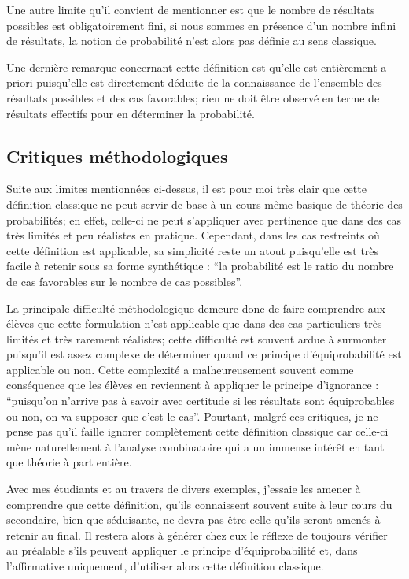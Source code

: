 \documentclass[11pt,a4paper]{article}
\begin{document}
Une autre limite qu'il convient de mentionner est que le nombre de résultats possibles est obligatoirement fini, si nous sommes en présence d'un nombre infini de résultats, la notion de probabilité n'est alors pas définie au sens classique.

Une dernière remarque concernant cette définition est qu'elle est entièrement a priori puisqu'elle est directement déduite de la connaissance de l'ensemble des résultats possibles et des cas favorables; rien ne doit être observé en terme de résultats effectifs pour en déterminer la probabilité.

\subsection{Critiques méthodologiques}

Suite aux limites mentionnées ci-dessus, il est pour moi très clair que cette définition classique ne peut servir de base à un cours même basique de théorie des probabilités; en effet, celle-ci ne peut s'appliquer avec pertinence que dans des cas très limités et peu réalistes en pratique. Cependant, dans les cas restreints où cette définition est applicable, sa simplicité reste un atout puisqu'elle est très facile à retenir sous sa forme synthétique : ``la probabilité est le ratio du nombre de cas favorables sur le nombre de cas possibles''.

La principale difficulté méthodologique demeure donc de faire comprendre aux élèves que cette formulation n'est applicable que dans des cas particuliers très limités et très rarement réalistes; cette difficulté est souvent ardue à surmonter puisqu'il est assez complexe de déterminer quand ce principe d'équiprobabilité est applicable ou non. Cette complexité a malheureusement souvent comme conséquence que les élèves en reviennent à appliquer le principe d'ignorance : ``puisqu'on n'arrive pas à savoir avec certitude si les résultats sont équiprobables ou non, on va supposer que c'est le cas''. Pourtant, malgré ces critiques, je ne pense pas qu'il faille ignorer complètement cette définition classique car celle-ci mène naturellement à l'analyse combinatoire qui a un immense intérêt en tant que théorie à part entière.

Avec mes étudiants et au travers de divers exemples, j'essaie les amener à comprendre que cette définition, qu'ils connaissent souvent suite à leur cours du secondaire, bien que séduisante, ne devra pas être celle qu'ils seront amenés à retenir au final. Il restera alors à générer chez eux le réflexe de toujours vérifier au préalable s'ils peuvent appliquer le principe d'équiprobabilité et, dans l'affirmative uniquement, d'utiliser alors cette définition classique.
\end{document}
